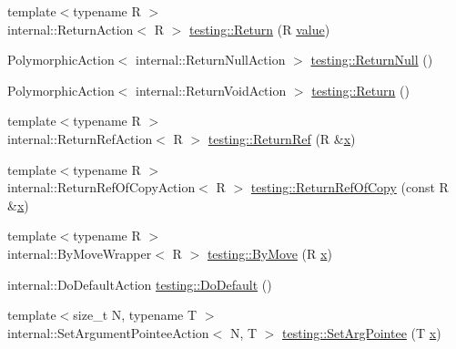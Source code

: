 \begin{DoxyCompactItemize}
\item 
{\footnotesize template$<$typename R $>$ }\\internal\+::\+Return\+Action$<$ R $>$ \mbox{\hyperlink{namespacetesting_adae3994eb444d1ad2dd602454b854663}{testing\+::\+Return}} (R \mbox{\hyperlink{_obj__test_2lib_2googletest-master_2googlemock_2test_2gmock-matchers__test_8cc_a337b8a670efc0b086ad3af163f3121b6}{value}})
\item 
Polymorphic\+Action$<$ internal\+::\+Return\+Null\+Action $>$ \mbox{\hyperlink{namespacetesting_af05e07c0484961f2a30ba44d1d1816fe}{testing\+::\+Return\+Null}} ()
\item 
Polymorphic\+Action$<$ internal\+::\+Return\+Void\+Action $>$ \mbox{\hyperlink{namespacetesting_a492ba67db1dfe5dc8257b6e3d38b8183}{testing\+::\+Return}} ()
\item 
{\footnotesize template$<$typename R $>$ }\\internal\+::\+Return\+Ref\+Action$<$ R $>$ \mbox{\hyperlink{namespacetesting_ac17089d5ca6377944d3792fbdc5c5d9b}{testing\+::\+Return\+Ref}} (R \&\mbox{\hyperlink{_obj__test_2lib_2googletest-master_2googlemock_2test_2gmock-matchers__test_8cc_a6150e0515f7202e2fb518f7206ed97dc}{x}})
\item 
{\footnotesize template$<$typename R $>$ }\\internal\+::\+Return\+Ref\+Of\+Copy\+Action$<$ R $>$ \mbox{\hyperlink{namespacetesting_ab84f2bf2f22aa75d8b52887bfc7d218c}{testing\+::\+Return\+Ref\+Of\+Copy}} (const R \&\mbox{\hyperlink{_obj__test_2lib_2googletest-master_2googlemock_2test_2gmock-matchers__test_8cc_a6150e0515f7202e2fb518f7206ed97dc}{x}})
\item 
{\footnotesize template$<$typename R $>$ }\\internal\+::\+By\+Move\+Wrapper$<$ R $>$ \mbox{\hyperlink{namespacetesting_a38293837852ef2c406b063741018d108}{testing\+::\+By\+Move}} (R \mbox{\hyperlink{_obj__test_2lib_2googletest-master_2googlemock_2test_2gmock-matchers__test_8cc_a6150e0515f7202e2fb518f7206ed97dc}{x}})
\item 
internal\+::\+Do\+Default\+Action \mbox{\hyperlink{namespacetesting_ae041df61ff61ccb9753ba15b4309e1a6}{testing\+::\+Do\+Default}} ()
\item 
{\footnotesize template$<$size\+\_\+t N, typename T $>$ }\\internal\+::\+Set\+Argument\+Pointee\+Action$<$ N, T $>$ \mbox{\hyperlink{namespacetesting_a6dbe77dc170c495ea300dd9d74ed4595}{testing\+::\+Set\+Arg\+Pointee}} (T \mbox{\hyperlink{_obj__test_2lib_2googletest-master_2googlemock_2test_2gmock-matchers__test_8cc_a6150e0515f7202e2fb518f7206ed97dc}{x}})

\end{DoxyCompactItemize}
